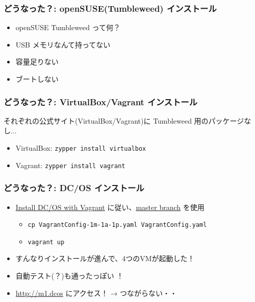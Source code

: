 \documentclass[aspectratio=169,11pt,hyperref={colorlinks=true}]{beamer}
\begin{document}
\begin{frame}
  \frametitle{どうなった？: openSUSE(Tumbleweed) インストール}
  \begin{itemize}
    \item openSUSE Tumbleweed って何？ %
    \item USB メモリなんて持ってない %
    \item 容量足りない
    \item ブートしない %
  \end{itemize}
\end{frame}

\begin{frame}
  \frametitle{どうなった？: VirtualBox/Vagrant インストール}
  それぞれの公式サイト(VirtualBox/Vagrant)に Tumbleweed 用のパッケージなし...
  \begin{itemize}
    \item VirtualBox: \lstinline[basicstyle=\ttfamily\footnotesize,columns=fixed]{zypper install virtualbox}
    \item Vagrant: \lstinline[basicstyle=\ttfamily\footnotesize,columns=fixed]{zypper install vagrant}
  \end{itemize}
\end{frame}

\begin{frame}
  \frametitle{どうなった？: DC/OS インストール}
  \begin{itemize}
    \item \href{https://dcos.io/docs/1.9/installing/local/}{Install DC/OS with Vagrant} に従い、\href{https://github.com/dcos/dcos-vagrant/}{master branch} を使用
    \begin{itemize}
      \item \lstinline[basicstyle=\ttfamily\footnotesize,columns=fixed]{cp VagrantConfig-1m-1a-1p.yaml VagrantConfig.yaml}
      \item \lstinline[basicstyle=\ttfamily\footnotesize,columns=fixed]{vagrant up}
    \end{itemize}
    \item すんなりインストールが進んで、4つのVMが起動した！
    \item 自動テスト(？)も通ったっぽい ！
    \item \url{http://m1.dcos} にアクセス！ → つながらない・・
  \end{itemize}
\end{frame}
\end{document}
